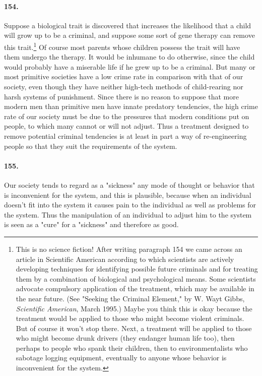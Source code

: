 \documentclass[12pt]{book}
\begin{document}
\paragraph{154.} Suppose a biological trait is discovered that increases the likelihood that a child will grow up to be a criminal, and suppose some sort of gene therapy can remove this trait.\footnote{This is no science fiction! After writing paragraph 154 we came across an article in Scientific American according to which scientists are actively developing techniques for identifying possible future criminals and for treating them by a combination of biological and psychological means. Some scientists advocate compulsory application of the treatment, which may be available in the near future. (See "Seeking the Criminal Element," by W. Wayt Gibbs, \emph{Scientific American}, March 1995.) Maybe you think this is okay because the treatment would be applied to those who might become violent criminals. But of course it won't stop there. Next, a treatment will be applied to those who might become drunk drivers (they endanger human life too), then perhaps to people who spank their children, then to environmentalists who sabotage logging equipment, eventually to anyone whose behavior is inconvenient for the system.} Of course most parents whose children possess the trait will have them undergo the therapy. It would be inhumane to do otherwise, since the child would probably have a miserable life if he grew up to be a criminal. But many or most primitive societies have a low crime rate in comparison with that of our society, even though they have neither high-tech methods of child-rearing nor harsh systems of punishment. Since there is no reason to suppose that more modern men than primitive men have innate predatory tendencies, the high crime rate of our society must be due to the pressures that modern conditions put on people, to which many cannot or will not adjust. Thus a treatment designed to remove potential criminal tendencies is at least in part a way of re-engineering people so that they suit the requirements of the system.


\paragraph{155.} Our society tends to regard as a "sickness" any mode of thought or behavior that is inconvenient for the system, and this is plausible, because when an individual doesn't fit into the system it causes pain to the individual as well as problems for the system. Thus the manipulation of an individual to adjust him to the system is seen as a "cure" for a "sickness" and therefore as good.
\end{document}
